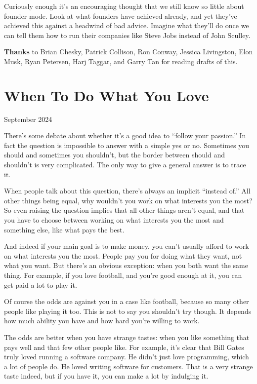 \documentclass[12pt]{book}
\begin{document}
Curiously enough it's an encouraging thought that we still know so
little about founder mode. Look at what founders have achieved already,
and yet they've achieved this against a headwind of bad advice. Imagine
what they'll do once we can tell them how to run their companies like
Steve Jobs instead of John Sculley.


\textbf{Thanks} to Brian Chesky, Patrick Collison, Ron Conway, Jessica
Livingston, Elon Musk, Ryan Petersen, Harj Taggar, and Garry Tan for
reading drafts of this.
\chapter{When To Do What You Love}

September 2024

There's some debate about whether it's a good idea to ``follow your
passion.'' In fact the question is impossible to answer with a simple
yes or no. Sometimes you should and sometimes you shouldn't, but the
border between should and shouldn't is very complicated. The only way to
give a general answer is to trace it.

When people talk about this question, there's always an implicit
``instead of.'' All other things being equal, why wouldn't you work on
what interests you the most? So even raising the question implies that
all other things aren't equal, and that you have to choose between
working on what interests you the most and something else, like what
pays the best.

And indeed if your main goal is to make money, you can't usually afford
to work on what interests you the most. People pay you for doing what
they want, not what you want. But there's an obvious exception: when you
both want the same thing. For example, if you love football, and you're
good enough at it, you can get paid a lot to play it.

Of course the odds are against you in a case like football, because so
many other people like playing it too. This is not to say you shouldn't
try though. It depends how much ability you have and how hard you're
willing to work.

The odds are better when you have strange tastes: when you like
something that pays well and that few other people like. For example,
it's clear that Bill Gates truly loved running a software company. He
didn't just love programming, which a lot of people do. He loved writing
software for customers. That is a very strange taste indeed, but if you
have it, you can make a lot by indulging it.
\end{document}
